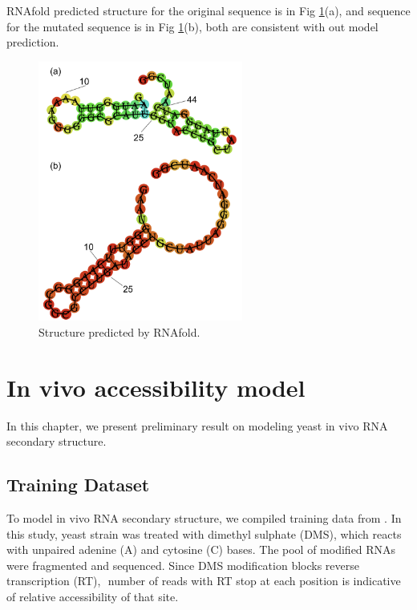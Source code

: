 \documentclass{proposal}
\begin{document}
RNAfold predicted structure for the original sequence is in Fig \ref{fig:base_pair_rnafold_structure}(a),
and sequence for the mutated sequence is in Fig \ref{fig:base_pair_rnafold_structure}(b),
both are consistent with out model prediction.


\begin{figure}[h!]
    \centering
    \includegraphics[width=0.6\textwidth]{plot/base_pair_rnafold_structure.png}
    \caption{Structure predicted by RNAfold.}
    \label{fig:base_pair_rnafold_structure}
    \centering
\end{figure}




\chapter{In vivo accessibility model}

In this chapter, we present preliminary result on modeling yeast in vivo RNA secondary structure.

\section{Training Dataset}

To model in vivo RNA secondary structure, we compiled training data from \cite{rouskin2014genome}.
In this study, yeast strain was treated with ﻿dimethyl sulphate (DMS), which reacts with ﻿unpaired adenine (A) and cytosine (C) bases.
The pool of modified RNAs were fragmented and sequenced.
Since ﻿DMS modification blocks reverse transcription (RT), ﻿
number of reads with RT stop at each position is indicative of relative accessibility of that site.
\end{document}
